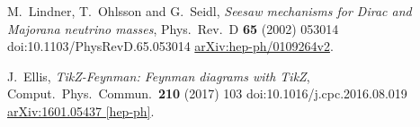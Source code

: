 \begin{thebibliography}{56}
M.~Lindner, T.~Ohlsson and G.~Seidl,
\textit{Seesaw mechanisms for Dirac and Majorana neutrino masses},
Phys.\ Rev.\ D {\textbf{ 65}} (2002) 053014
doi:10.1103/PhysRevD.65.053014
\href{https://arxiv.org/abs/hep-ph/0109264v2}{arXiv:hep-ph/0109264v2}.

J.~Ellis,
\textit{TikZ-Feynman: Feynman diagrams with TikZ},
Comput.\ Phys.\ Commun.\  {\textbf {210}} (2017) 103
doi:10.1016/j.cpc.2016.08.019
\href{https://arxiv.org/abs/1601.05437}{arXiv:1601.05437 [hep-ph]}.
\end{thebibliography}
